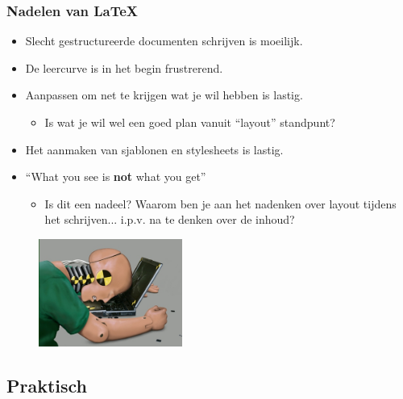 \documentclass{beamer}
\begin{document}
\begin{frame}
\frametitle{Nadelen van \LaTeX}
\begin{itemize}
 \item Slecht gestructureerde documenten schrijven is moeilijk.
 \item De leercurve is in het begin frustrerend.
 \item Aanpassen om net te krijgen wat je wil hebben is lastig.
 \begin{itemize}
  \item Is wat je wil wel een goed plan vanuit ``layout'' standpunt?
 \end{itemize}
 \item Het aanmaken van sjablonen en stylesheets is lastig.
 \item ``What you see is \textbf{not} what you get''
 \begin{itemize}
  \item Is dit een nadeel? Waarom ben je aan het nadenken over layout tijdens het schrijven... i.p.v. na te denken over de inhoud?
 \end{itemize}
\end{itemize}
\begin{figure}[h] 
  \includegraphics[width=0.42\textwidth]{images/dummy.jpg}
\end{figure}
\end{frame}

\subsection{Praktisch}
\end{document}

